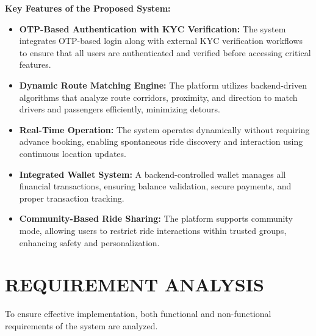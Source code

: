 \documentclass[10pt,a4paper]{report}
\begin{document}
\vspace{0.5em}
\noindent \textbf{Key Features of the Proposed System:}
\begin{itemize}
    \item \textbf{OTP-Based Authentication with KYC Verification:} The system integrates OTP-based login along with external KYC verification workflows to ensure that all users are authenticated and verified before accessing critical features.

    \item \textbf{Dynamic Route Matching Engine:} The platform utilizes backend-driven algorithms that analyze route corridors, proximity, and direction to match drivers and passengers efficiently, minimizing detours.

    \item \textbf{Real-Time Operation:} The system operates dynamically without requiring advance booking, enabling spontaneous ride discovery and interaction using continuous location updates.

    \item \textbf{Integrated Wallet System:} A backend-controlled wallet manages all financial transactions, ensuring balance validation, secure payments, and proper transaction tracking.

    \item \textbf{Community-Based Ride Sharing:} The platform supports community mode, allowing users to restrict ride interactions within trusted groups, enhancing safety and personalization.
\end{itemize}

\section{\textbf{REQUIREMENT ANALYSIS}}
\large\justify
To ensure effective implementation, both functional and non-functional requirements of the system are analyzed.
\end{document}
